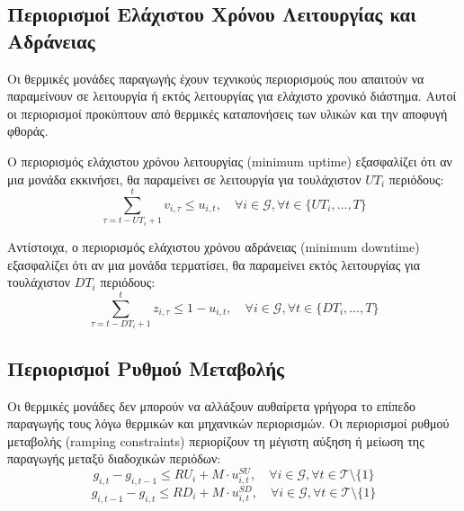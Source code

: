 \subsection{Περιορισμοί Ελάχιστου Χρόνου Λειτουργίας και Αδράνειας}
\label{subsec:uc-minupdown}

Οι θερμικές μονάδες παραγωγής έχουν τεχνικούς περιορισμούς που απαιτούν να παραμείνουν σε λειτουργία ή εκτός λειτουργίας για ελάχιστο χρονικό διάστημα. Αυτοί οι περιορισμοί προκύπτουν από θερμικές καταπονήσεις των υλικών και την αποφυγή φθοράς.

Ο περιορισμός ελάχιστου χρόνου λειτουργίας (minimum uptime) εξασφαλίζει ότι αν μια μονάδα εκκινήσει, θα παραμείνει σε λειτουργία για τουλάχιστον $UT_i$ περιόδους:
\begin{equation}
\label{eq:uc-min-uptime}
\sum_{\tau = t - UT_i + 1}^{t} v_{i,\tau} \leq u_{i,t}, \quad \forall i \in \mathcal{G}, \forall t \in \{UT_i, \ldots, T\}
\end{equation}

Αντίστοιχα, ο περιορισμός ελάχιστου χρόνου αδράνειας (minimum downtime) εξασφαλίζει ότι αν μια μονάδα τερματίσει, θα παραμείνει εκτός λειτουργίας για τουλάχιστον $DT_i$ περιόδους:
\begin{equation}
\label{eq:uc-min-downtime}
\sum_{\tau = t - DT_i + 1}^{t} z_{i,\tau} \leq 1 - u_{i,t}, \quad \forall i \in \mathcal{G}, \forall t \in \{DT_i, \ldots, T\}
\end{equation}

\subsection{Περιορισμοί Ρυθμού Μεταβολής}
\label{subsec:uc-ramping}

Οι θερμικές μονάδες δεν μπορούν να αλλάξουν αυθαίρετα γρήγορα το επίπεδο παραγωγής τους λόγω θερμικών και μηχανικών περιορισμών. Οι περιορισμοί ρυθμού μεταβολής (ramping constraints) περιορίζουν τη μέγιστη αύξηση ή μείωση της παραγωγής μεταξύ διαδοχικών περιόδων:
\begin{equation}
\label{eq:uc-rampup}
g_{i,t} - g_{i,t-1} \leq RU_i + M \cdot u_{i,t}^{SU}, \quad \forall i \in \mathcal{G}, \forall t \in \mathcal{T} \setminus \{1\}
\end{equation}
\begin{equation}
\label{eq:uc-rampdown}
g_{i,t-1} - g_{i,t} \leq RD_i + M \cdot u_{i,t}^{SD}, \quad \forall i \in \mathcal{G}, \forall t \in \mathcal{T} \setminus \{1\}
\end{equation}

